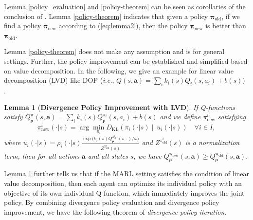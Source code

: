 \documentclass{article}
\newtheorem{lemma}{Lemma}
\begin{document}
Lemma \ref{policy_evaluation} and \ref{policy-theorem} can be seen as corollaries of the conclusion of \citet{SAC}. Lemma \ref{policy-theorem} indicates that given a policy ${\bm{\pi}}_{\operatorname{old}}$, if we find a policy ${\bm{\pi}}_{\operatorname{new}}$ according to (\ref{eq:lemma2}), then the policy ${\bm{\pi}}_{\operatorname{new}}$ is better than ${\bm{\pi}}_{\operatorname{old}}$. 

Lemma \ref{policy-theorem} does not make any assumption and is for general settings. Further, the policy improvement can be established and simplified based on value decomposition. 	In the following, we give an example for linear value decomposition (LVD) like DOP (\textit{i.e.}, $Q(s,\bm{a}) = \sum_i k_i(s) Q_i(s,a_i) + b(s)$) \citep{DOP}. 


\begin{lemma}[\bf Divergence Policy Improvement with LVD] \label{policy-LVD-theorem}
	If Q-functions satisfy $Q^{{\bm{\pi}}}_{\bm{\rho}}(s,\bm{a}) = \sum_i k_i(s) Q^{\pi_i}_{\bm{\rho}}(s,a_i) + b(s)$ and  we define ${\pi}_{\operatorname{new}}^i$ satisfying
	\[\pi^i_{\operatorname{new}}(\cdot|s) = \arg \min_{\pi_i} D_{\operatorname{KL}}\left( \pi_i(\cdot|s) \| u_i(\cdot|s) \right) \quad \forall i \in I,\]
	where $u_i(\cdot|s) = {\rho_i}(\cdot|s) \frac{\exp\big( k_i(s) Q^{{\pi}^i_{\operatorname{old}}}_{\bm{\rho}}(s,\cdot) / \omega \big)}{Z^{{\pi}^i_{\operatorname{old}}}(s)}$ and $Z^{{\pi}^i_{\operatorname{old}}}(s)$ is a normalization term, then for all actions $\bm{a}$ and all states $s$, we have
	$Q^{{\bm{\pi}}_{\operatorname{new}}}_{\bm{\rho}}(s,\bm{a}) \geq Q^{{\bm{\pi}}_{\operatorname{old}}}_{\bm{\rho}}(s,\bm{a})$.
\end{lemma}

Lemma \ref{policy-LVD-theorem} further tells us that if the MARL setting satisfies the condition of linear value decomposition, then each agent can optimize its individual policy with an objective of its own individual Q-function, which immediately improves the joint policy. 
By combining divergence policy evaluation and divergence policy improvement, we have the following theorem of \textit{divergence policy iteration}.
\end{document}

